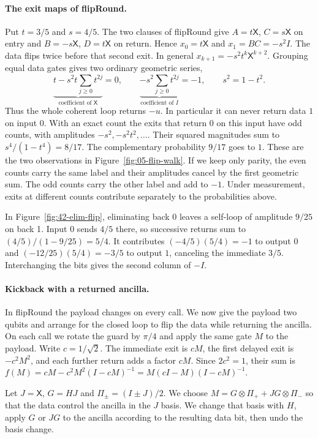 \documentclass[acmsmall,screen,review,anonymous,nonacm]{acmart}
\newcommand{\storyinlineface}{\small\ttfamily}
\newcommand{\code}[1]{\textnormal{\storyinlineface #1}}
\numberwithin{equation}{section}
\begin{document}
\paragraph{The exit maps of \code{flipRound}.}
Put $t=3/5$ and $s=4/5$. The two clauses of \code{flipRound} give
$A=t\mathsf X$, $C=s\mathsf X$ on entry and $B=-s\mathsf X$,
$D=t\mathsf X$ on return. Hence $x_0=t\mathsf X$ and $x_1=BC=-s^2 I$.
The data flips twice before that second exit. In general
$x_{k+1}=-s^2t^k\mathsf X^{k+2}$. Grouping equal data gates gives two
ordinary geometric series,
\[
 \underbrace{t-s^2t\sum_{j\ge0}t^{2j}}_{\text{coefficient of }\mathsf
 X}=0,
 \qquad
 \underbrace{-s^2\sum_{j\ge0}t^{2j}}_{\text{coefficient of }I}=-1,
 \qquad s^2=1-t^2 .
\]
Thus the whole coherent loop returns $-u$. In particular it can never
return data $1$ on input $0$. With an exact count the exits that
return $0$ on this input have odd counts, with amplitudes
$-s^2,-s^2t^2,\ldots$. Their squared magnitudes sum to
$s^4/(1-t^4)=8/17$. The complementary probability $9/17$ goes to $1$.
These are the two observations in Figure~\ref{fig:05-flip-walk}.
If we keep only parity, the even counts carry the same label and their
amplitudes cancel by the first geometric sum. The odd counts carry the other
label and add to $-1$. Under measurement, exits at different counts contribute separately to the probabilities above.

In Figure~\ref{fig:42-elim-flip}, eliminating \code{back 0} leaves
a self-loop of amplitude $9/25$ on \code{back 1}. Input $0$ sends $4/5$
there, so successive returns sum to $(4/5)/(1-9/25)=5/4$.
It contributes $(-4/5)(5/4)=-1$ to output $0$ and
$(-12/25)(5/4)=-3/5$ to output $1$, canceling the immediate $3/5$.
Interchanging the bits gives the second column of $-I$.

\paragraph{Kickback with a returned ancilla.}\label{app:kickback}
In \code{flipRound} the payload changes on every call. We now give the
payload two qubits and arrange for the closed loop to flip the data
while returning the ancilla. On each call we rotate the guard by
$\pi/4$ and apply the same gate $M$ to the payload. Write $c=1/\sqrt2$.
The immediate exit is $cM$, the first delayed exit is $-c^2M^2$, and
each further return adds a factor $cM$. Since $2c^2=1$, their sum is
$f(M)=cM-c^2M^2(I-cM)^{-1}=M(cI-M)(I-cM)^{-1}$.

Let $J=\mathsf X$, $G=HJ$ and $\Pi_\pm=(I\pm J)/2$. We choose $M=G\otimes\Pi_++JG\otimes\Pi_-$ so that the data control the ancilla in the $J$ basis. We change that basis
with $H$, apply $G$ or $JG$ to the ancilla according to the resulting data bit,
then undo the basis change.
\end{document}
